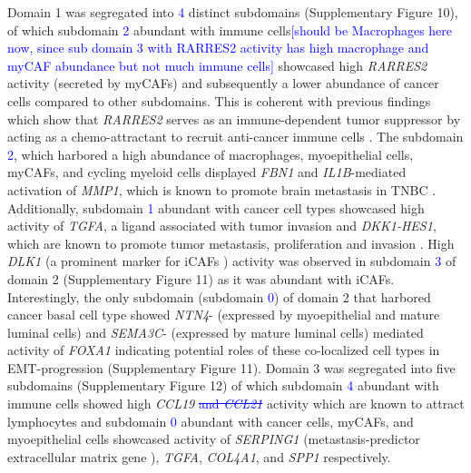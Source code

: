 Domain 1 was segregated into \textcolor{blue}{4} distinct subdomains (Supplementary Figure 10), of which subdomain \textcolor{blue}{2} abundant with immune cells\textcolor{blue}{[should be Macrophages here now, since sub domain 3 with RARRES2 activity has high macrophage and myCAF abundance but not much immune cells]} showcased high \textit{RARRES2}  activity (secreted by myCAFs) and subsequently a lower abundance of cancer cells compared to other subdomains. This is coherent with previous findings which show that \textit{RARRES2} serves as an immune-dependent tumor suppressor by acting as a chemo-attractant to recruit anti-cancer immune cells \citep{wittamer2003specific,wittamer2005neutrophil,zabel2005chemokine,vermi2005role}. The subdomain \textcolor{blue}{2}, which harbored a high abundance of macrophages, myoepithelial cells, myCAFs, and cycling myeloid cells displayed \textit{FBN1} and \textit{IL1B}-mediated activation of \textit{MMP1}, which is known to promote brain metastasis in TNBC \citep{Liu2012}. Additionally, subdomain \textcolor{blue}{1} abundant with cancer cell types showcased high activity of \textit{TGFA}, a ligand associated with tumor invasion \citep{doi.org/10.1002/ijc.28295} and \textit{DKK1-HES1}, which are known to promote tumor metastasis, proliferation and invasion \citep{zhu2021expression, Li2018}. High \textit{DLK1} (a prominent marker for iCAFs \citep{10.1158/2159-8290.CD-19-1384}) activity was observed in subdomain \textcolor{blue}{3} of domain 2 (Supplementary Figure 11) as it was abundant with iCAFs. Interestingly, the only subdomain (subdomain \textcolor{blue}{0}) of domain 2 that harbored cancer basal cell type showed \textit{NTN4}- (expressed by myoepithelial and mature luminal cells) and \textit{SEMA3C}- (expressed by mature luminal cells) mediated activity of \textit{FOXA1} indicating potential roles of these co-localized cell types in EMT-progression \citep{anzai2017foxa1} (Supplementary Figure 11). Domain 3 was segregated into five subdomains (Supplementary Figure 12) of which subdomain \textcolor{blue}{4} abundant with immune cells showed high \textit{CCL19} \textcolor{blue}{\sout{and \textit{CCL21}}} activity which are known to attract lymphocytes \citep{vicari2000antitumor} and subdomain \textcolor{blue}{0} abundant with cancer cells, myCAFs, and myoepithelial cells showcased activity of \textit{SERPING1} (metastasis-predictor extracellular matrix gene \citep{doi:10.1073/pnas.0710331105}), \textit{TGFA}, \textit{COL4A1}, and \textit{SPP1} respectively.
 
